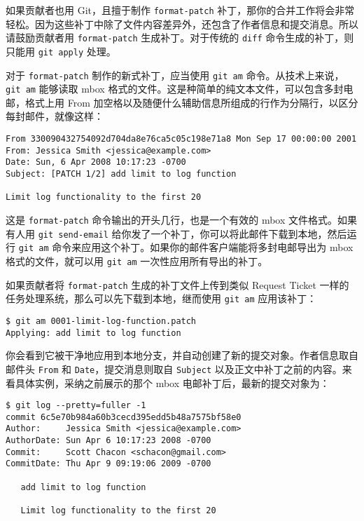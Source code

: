 \documentclass[a4paper]{book}
\begin{document}
如果贡献者也用 Git，且擅于制作 \texttt{format-patch} 补丁，那你的合并工作将会非常轻松。因为这些补丁中除了文件内容差异外，还包含了作者信息和提交消息。所以请鼓励贡献者用 \texttt{format-patch} 生成补丁。对于传统的 \texttt{diff} 命令生成的补丁，则只能用 \texttt{git apply} 处理。

对于 \texttt{format-patch} 制作的新式补丁，应当使用 \texttt{git am} 命令。从技术上来说，\texttt{git am} 能够读取 mbox 格式的文件。这是种简单的纯文本文件，可以包含多封电邮，格式上用 From 加空格以及随便什么辅助信息所组成的行作为分隔行，以区分每封邮件，就像这样：

\begin{shaded}\begin{verbatim}
From 330090432754092d704da8e76ca5c05c198e71a8 Mon Sep 17 00:00:00 2001
From: Jessica Smith <jessica@example.com>
Date: Sun, 6 Apr 2008 10:17:23 -0700
Subject: [PATCH 1/2] add limit to log function

Limit log functionality to the first 20
\end{verbatim}\end{shaded}

这是 \texttt{format-patch} 命令输出的开头几行，也是一个有效的 mbox 文件格式。如果有人用 \texttt{git send-email} 给你发了一个补丁，你可以将此邮件下载到本地，然后运行 \texttt{git am} 命令来应用这个补丁。如果你的邮件客户端能将多封电邮导出为 mbox 格式的文件，就可以用 \texttt{git am} 一次性应用所有导出的补丁。

如果贡献者将 \texttt{format-patch} 生成的补丁文件上传到类似 Request Ticket 一样的任务处理系统，那么可以先下载到本地，继而使用 \texttt{git am} 应用该补丁：

\begin{shaded}\begin{verbatim}
$ git am 0001-limit-log-function.patch 
Applying: add limit to log function
\end{verbatim}\end{shaded}

你会看到它被干净地应用到本地分支，并自动创建了新的提交对象。作者信息取自邮件头 \texttt{From} 和 \texttt{Date}，提交消息则取自 \texttt{Subject} 以及正文中补丁之前的内容。来看具体实例，采纳之前展示的那个 mbox 电邮补丁后，最新的提交对象为：

\begin{shaded}\begin{verbatim}
$ git log --pretty=fuller -1
commit 6c5e70b984a60b3cecd395edd5b48a7575bf58e0
Author:     Jessica Smith <jessica@example.com>
AuthorDate: Sun Apr 6 10:17:23 2008 -0700
Commit:     Scott Chacon <schacon@gmail.com>
CommitDate: Thu Apr 9 09:19:06 2009 -0700

   add limit to log function

   Limit log functionality to the first 20
\end{verbatim}\end{shaded}
\end{document}
